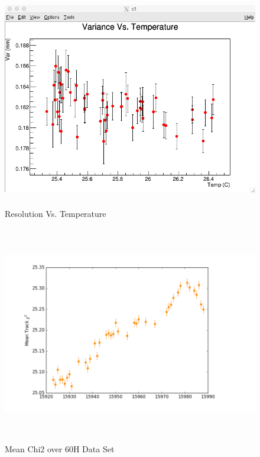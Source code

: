 \documentclass[./Thesis]{subfiles}
\begin{document}
\begin{figure}
	\centerline{\includegraphics[height=95mm]{VarianceVsTempIN.png}}
	\caption[Resolution Vs. Temperature]{Resolution Vs. Temperature}
	\label{fig:ResRun}
\end{figure} 

\begin{figure}
	\centerline{\includegraphics[height=95mm]{MeanChi260HDataSet.png}}
	\caption[Mean Chi2 over 60H Data Set]{ Mean Chi2 over 60H Data Set}
	\label{fig:ChiRun}
\end{figure} 
\end{document}
